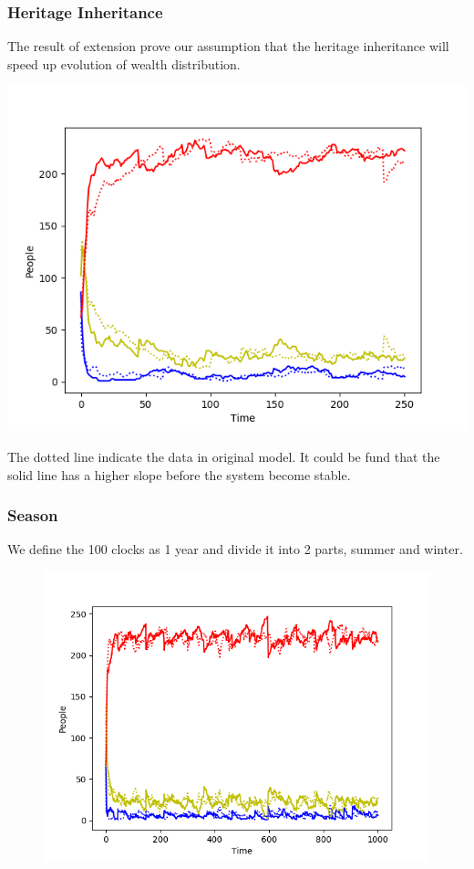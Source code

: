 \subsubsection{Heritage Inheritance}
The result of extension prove our assumption that the heritage inheritance will speed up evolution of wealth distribution. 
\begin{center}
	\includegraphics[scale=0.6]{Inheritance.png}
\end{center}
The dotted line indicate the data in original model. It could be fund that the solid line has a higher slope before the system become stable. 
\subsubsection{Season}
We define the 100 clocks as 1 year and divide it into 2 parts, summer and winter. 
\begin{figure}[H]
	\begin{center}
		\includegraphics[scale= 0.6]{season.png}
	\end{center}
\end{figure}

